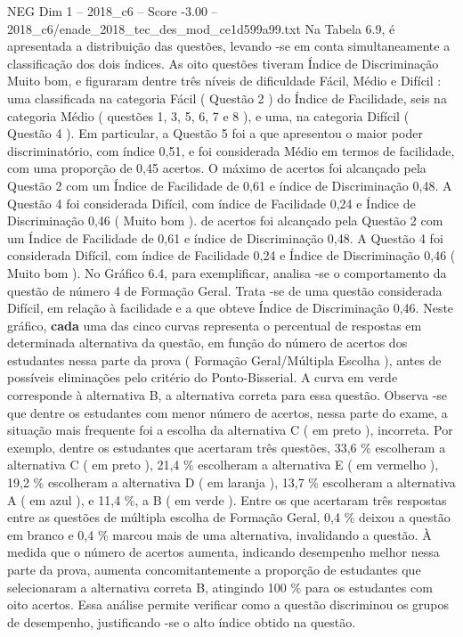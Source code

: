 \begin{textsample}{NEG Dim 1 – 2018\_c6 – Score -3.00 – 2018\_c6/enade\_2018\_tec\_des\_mod\_ce1d599a99.txt}
Na Tabela 6.9, é apresentada a distribuição das questões, levando -se em conta simultaneamente a classificação dos dois índices.
As oito questões tiveram Índice de Discriminação Muito bom, e figuraram dentre três níveis de dificuldade Fácil, Médio e Difícil : uma classificada na categoria Fácil ( Questão 2 ) do Índice de Facilidade, seis na categoria Médio ( questões 1, 3, 5, 6, 7 e 8 ), e uma, na categoria Difícil ( Questão 4 ).
Em particular, a Questão 5 foi a que apresentou o maior poder discriminatório, com índice 0,51, e foi considerada Médio em termos de facilidade, com uma proporção de 0,45 acertos.
O máximo de acertos foi alcançado pela Questão 2 com um Índice de Facilidade de 0,61 e índice de Discriminação 0,48.
A Questão 4 foi considerada Difícil, com índice de Facilidade 0,24 e Índice de Discriminação 0,46 ( Muito bom ). de acertos foi alcançado pela Questão 2 com um Índice de Facilidade de 0,61 e índice de Discriminação 0,48.
A Questão 4 foi considerada Difícil, com índice de Facilidade 0,24 e Índice de Discriminação 0,46 ( Muito bom ).
No Gráfico 6.4, para exemplificar, analisa -se o comportamento da questão de número 4 de Formação Geral.
Trata -se de uma questão considerada Difícil, em relação à facilidade e a que obteve Índice de Discriminação 0,46.
Neste gráfico, \textbf{cada} uma das cinco curvas representa o percentual de respostas em determinada alternativa da questão, em função do número de acertos dos estudantes nessa parte da prova ( Formação Geral/Múltipla Escolha ), antes de possíveis eliminações pelo critério do Ponto-Bisserial.
A curva em verde corresponde à alternativa B, a alternativa correta para essa questão.
Observa -se que dentre os estudantes com menor número de acertos, nessa parte do exame, a situação mais frequente foi a escolha da alternativa C ( em preto ), incorreta.
Por exemplo, dentre os estudantes que acertaram três questões, 33,6 \% escolheram a alternativa C ( em preto ), 21,4 \% escolheram a alternativa E ( em vermelho ), 19,2 \% escolheram a alternativa D ( em laranja ), 13,7 \% escolheram a alternativa A ( em azul ), e 11,4 \%, a B ( em verde ).
Entre os que acertaram três respostas entre as questões de múltipla escolha de Formação Geral, 0,4 \% deixou a questão em branco e 0,4 \% marcou mais de uma alternativa, invalidando a questão.
À medida que o número de acertos aumenta, indicando desempenho melhor nessa parte da prova, aumenta concomitantemente a proporção de estudantes que selecionaram a alternativa correta B, atingindo 100 \% para os estudantes com oito acertos.
Essa análise permite verificar como a questão discriminou os grupos de desempenho, justificando -se o alto índice obtido na questão.

\end{textsample}
